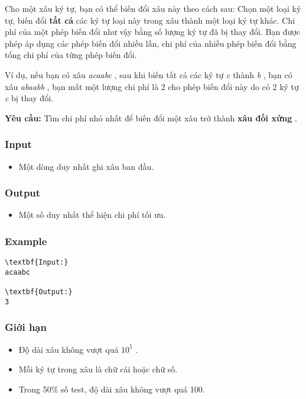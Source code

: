 

Cho một xâu ký tự, bạn có thể biến đổi xâu này theo cách sau: Chọn một loại ký tự, biến đổi \textbf{ tất cả } các ký tự loại này trong xâu thành một loại ký tự khác. Chi phí của một phép biến đổi như vậy bằng số lượng ký tự đã bị thay đổi. Bạn được phép áp dụng các phép biến đổi nhiều lần, chi phí của nhiều phép biến đổi bằng tổng chi phí của từng phép biến đổi.

Ví dụ, nếu bạn có xâu \emph{ acaabc } , sau khi biến tất cả các ký tự \emph{ c } thành \emph{ b } , bạn có xâu \emph{ abaabb } , bạn mất một lượng chi phí là 2 cho phép biến đổi này do có 2 ký tự \emph{ c } bị thay đổi.

\textbf{Yêu cầu: } Tìm chi phí nhỏ nhất để biến đổi một xâu trở thành \textbf{ xâu đối xứng } .

\subsubsection{Input}
\begin{itemize}
	\item Một dòng duy nhất ghi xâu ban đầu.
\end{itemize}

\subsubsection{Output}
\begin{itemize}
	\item Một số duy nhất thể hiện chi phí tối ưu.
\end{itemize}

\subsubsection{Example}
\begin{verbatim}
\textbf{Input:}
acaabc

\textbf{Output:}
3\end{verbatim}

\subsubsection{Giới hạn}
\begin{itemize}
	\item Độ dài xâu không vượt quá $10^{5}$ .
	\item Mỗi ký tự trong xâu là chữ cái hoặc chữ số.
	\item Trong 50\% số test, độ dài xâu không vượt quá 100.
\end{itemize}
